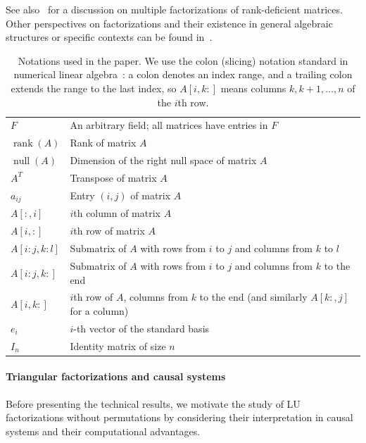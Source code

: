 \documentclass[final]{siamart1116}
\numberwithin{theorem}{section}
\DeclareMathOperator{\rk}{rank}
\DeclareMathOperator{\nl}{null}
\begin{document}
See also~\cite{dopico_multiple_2006} for a discussion on multiple factorizations of rank-deficient matrices. Other perspectives on factorizations and their existence in general algebraic structures or specific contexts can be found in~\cite{nagarajan_products_1999,johnson_inherited_1989,jeffrey_lu_2010,higham_gaussian_2011}.

\begin{table}[htbp]
  \caption{Notations used in the paper. We use the colon (slicing) notation standard in numerical linear algebra~\cite{golub_matrix_2013}: a colon denotes an index range, and a trailing colon extends the range to the last index, so $A[i,k:]$ means columns $k, k+1, \ldots, n$ of the $i$th row.}
  \label{tab:notations}
  \centering
  \begin{tabularx}{\linewidth}{@{}l>{\raggedright\arraybackslash}X@{}}
    \toprule
    $F$          & An arbitrary field; all matrices have entries in $F$ \\
    $\rk(A)$     & Rank of matrix $A$ \\
    $\nl(A)$     & Dimension of the right null space of matrix $A$ \\
    $A^T$        & Transpose of matrix $A$ \\
    $a_{ij}$     & Entry $(i,j)$ of matrix $A$ \\
    $A[:,i]$     & $i$th column of matrix $A$ \\
    $A[i,:]$     & $i$th row of matrix $A$ \\
    $A[i:j,k:l]$ & Submatrix of $A$ with rows from $i$ to $j$ and columns from $k$ to $l$ \\
    $A[i:j,k:]$  & Submatrix of $A$ with rows from $i$ to $j$ and columns from $k$ to the end \\
    $A[i,k:]$    & $i$th row of $A$, columns from $k$ to the end (and similarly $A[k:,j]$ for a column) \\
    $e_i$        & $i$-th vector of the standard basis \\
    $I_n$        & Identity matrix of size $n$ \\
    \bottomrule
  \end{tabularx}
\end{table}

\paragraph{Triangular factorizations and causal systems} Before presenting the technical results, we motivate the study of LU factorizations without permutations by considering their interpretation in causal systems and their computational advantages.
\end{document}
